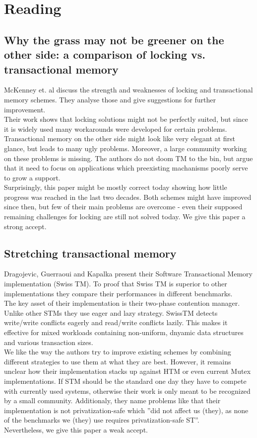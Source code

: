 \documentclass{article}
\newcommand{\enterProblemHeader}[1]{
}
\newcommand{\exitProblemHeader}[1]{
}
\newcounter{homeworkProblemCounter} %
\newcommand{\homeworkProblemName}{}
\newenvironment{homeworkProblem}[1][Problem \arabic{homeworkProblemCounter}]{ %
\stepcounter{homeworkProblemCounter} %
\renewcommand{\homeworkProblemName}{#1} %
\section{\homeworkProblemName} %
}{
}
\begin{document}
\begin{homeworkProblem}[Reading]
\subsection{Why the grass may not be greener on the other side: a comparison of locking vs. transactional memory}
McKenney et. al discuss the strength and weaknesses of locking and transactional memory schemes. They analyse those and give suggestions for further improvement. \\
Their work shows that locking solutions might not be perfectly suited, but since it is widely used many workarounds were developed for certain problems. Transactional memory on the other side might look like very elegant at first glance, but leads to many ugly problems. Moreover, a large community working on these problems is missing. The authors do not doom TM to the bin, but argue that it need to focus on applications which preexisting machanisms poorly serve to grow a support. \\
Surprisingly, this paper might be mostly correct today showing how little progress was reached in the last two decades. Both schemes might have improved since then, but few of their main problems are overcome - even their supposed remaining challenges for locking are still not solved today. We give this paper a strong accept.



\subsection{Stretching transactional memory}
Dragojevic, Guerraoui and Kapalka present their Software Transactional Memory implementation (Swiss TM). To proof that Swiss TM is superior to other implementations they compare their performances in different benchmarks. \\
The key asset of their implementation is their two-phase contention manager. Unlike other STMs they use eager and lazy strategy. SwissTM  detects write/write conflicts eagerly and read/write conflicts lazily. This makes it effective for mixed workloads containing non-uniform, dnyamic data structures and various transaction sizes. \\
We like the way the authors try to improve existing schemes by combining different strategies to use them at what they are best. However, it remains unclear how their implementation stacks up against HTM or even current Mutex implementations. If STM should be the standard one day they have to compete with currently used systems, otherwise their work is only meant to be recognized by a small community. Additionaly, they name problems like that their implementation is not privatization-safe which ''did not affect us (they), as none of the benchmarks we (they) use requires privatization-safe ST''. \\
Nevertheless, we give this paper a weak accept.

\end{homeworkProblem}
\end{document}
